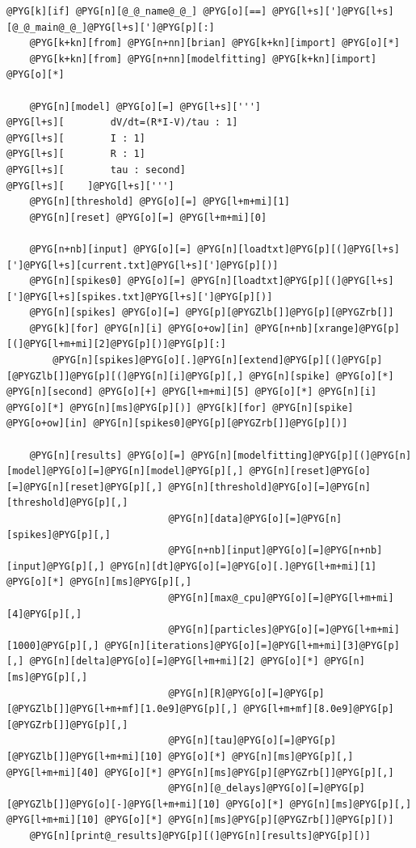 \documentclass[letterpaper,10pt,english]{manual}
\begin{document}
\begin{Verbatim}[commandchars=@\[\]]
@PYG[k][if] @PYG[n][@_@_name@_@_] @PYG[o][==] @PYG[l+s][']@PYG[l+s][@_@_main@_@_]@PYG[l+s][']@PYG[p][:]
    @PYG[k+kn][from] @PYG[n+nn][brian] @PYG[k+kn][import] @PYG[o][*]
    @PYG[k+kn][from] @PYG[n+nn][modelfitting] @PYG[k+kn][import] @PYG[o][*]

    @PYG[n][model] @PYG[o][=] @PYG[l+s][''']
@PYG[l+s][        dV/dt=(R*I-V)/tau : 1]
@PYG[l+s][        I : 1]
@PYG[l+s][        R : 1]
@PYG[l+s][        tau : second]
@PYG[l+s][    ]@PYG[l+s][''']
    @PYG[n][threshold] @PYG[o][=] @PYG[l+m+mi][1]
    @PYG[n][reset] @PYG[o][=] @PYG[l+m+mi][0]

    @PYG[n+nb][input] @PYG[o][=] @PYG[n][loadtxt]@PYG[p][(]@PYG[l+s][']@PYG[l+s][current.txt]@PYG[l+s][']@PYG[p][)]
    @PYG[n][spikes0] @PYG[o][=] @PYG[n][loadtxt]@PYG[p][(]@PYG[l+s][']@PYG[l+s][spikes.txt]@PYG[l+s][']@PYG[p][)]
    @PYG[n][spikes] @PYG[o][=] @PYG[p][@PYGZlb[]]@PYG[p][@PYGZrb[]]
    @PYG[k][for] @PYG[n][i] @PYG[o+ow][in] @PYG[n+nb][xrange]@PYG[p][(]@PYG[l+m+mi][2]@PYG[p][)]@PYG[p][:]
        @PYG[n][spikes]@PYG[o][.]@PYG[n][extend]@PYG[p][(]@PYG[p][@PYGZlb[]]@PYG[p][(]@PYG[n][i]@PYG[p][,] @PYG[n][spike] @PYG[o][*] @PYG[n][second] @PYG[o][+] @PYG[l+m+mi][5] @PYG[o][*] @PYG[n][i] @PYG[o][*] @PYG[n][ms]@PYG[p][)] @PYG[k][for] @PYG[n][spike] @PYG[o+ow][in] @PYG[n][spikes0]@PYG[p][@PYGZrb[]]@PYG[p][)]

    @PYG[n][results] @PYG[o][=] @PYG[n][modelfitting]@PYG[p][(]@PYG[n][model]@PYG[o][=]@PYG[n][model]@PYG[p][,] @PYG[n][reset]@PYG[o][=]@PYG[n][reset]@PYG[p][,] @PYG[n][threshold]@PYG[o][=]@PYG[n][threshold]@PYG[p][,]
                            @PYG[n][data]@PYG[o][=]@PYG[n][spikes]@PYG[p][,]
                            @PYG[n+nb][input]@PYG[o][=]@PYG[n+nb][input]@PYG[p][,] @PYG[n][dt]@PYG[o][=]@PYG[o][.]@PYG[l+m+mi][1] @PYG[o][*] @PYG[n][ms]@PYG[p][,]
                            @PYG[n][max@_cpu]@PYG[o][=]@PYG[l+m+mi][4]@PYG[p][,]
                            @PYG[n][particles]@PYG[o][=]@PYG[l+m+mi][1000]@PYG[p][,] @PYG[n][iterations]@PYG[o][=]@PYG[l+m+mi][3]@PYG[p][,] @PYG[n][delta]@PYG[o][=]@PYG[l+m+mi][2] @PYG[o][*] @PYG[n][ms]@PYG[p][,]
                            @PYG[n][R]@PYG[o][=]@PYG[p][@PYGZlb[]]@PYG[l+m+mf][1.0e9]@PYG[p][,] @PYG[l+m+mf][8.0e9]@PYG[p][@PYGZrb[]]@PYG[p][,]
                            @PYG[n][tau]@PYG[o][=]@PYG[p][@PYGZlb[]]@PYG[l+m+mi][10] @PYG[o][*] @PYG[n][ms]@PYG[p][,] @PYG[l+m+mi][40] @PYG[o][*] @PYG[n][ms]@PYG[p][@PYGZrb[]]@PYG[p][,]
                            @PYG[n][@_delays]@PYG[o][=]@PYG[p][@PYGZlb[]]@PYG[o][-]@PYG[l+m+mi][10] @PYG[o][*] @PYG[n][ms]@PYG[p][,] @PYG[l+m+mi][10] @PYG[o][*] @PYG[n][ms]@PYG[p][@PYGZrb[]]@PYG[p][)]
    @PYG[n][print@_results]@PYG[p][(]@PYG[n][results]@PYG[p][)]
\end{Verbatim}
\end{document}
